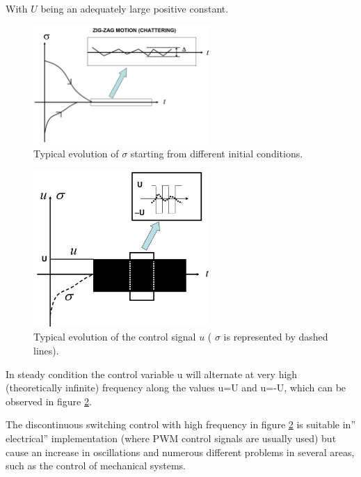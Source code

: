 \documentclass{thesisreport}
\begin{document}
With $U$ being an adequately large positive constant.

\begin{figure}[h]
\centering
\includegraphics[width=0.6\textwidth]{Images/Control/first_order_sliding_mode_control}
\caption{Typical evolution of $\sigma$ starting from different initial conditions.}
\label{sigma_evolution}
\end{figure}

\begin{figure}[h]
\centering
\includegraphics[width=0.6\textwidth]{Images/Control/first_order_sliding_mode_control_b}
\caption{Typical evolution of the control signal $u$ ( $\sigma$ is represented by dashed lines).}
\label{control_evolution}
\end{figure}


\noindent In steady condition the control variable u will alternate at very high (theoretically infinite) frequency along the values u=U
and u=-U, which can be observed in figure \ref{control_evolution}.



\noindent The discontinuous switching control with high frequency  in figure \ref{control_evolution} is suitable in” electrical” implementation (where PWM control signals are usually used) but cause an increase in oscillations and numerous different problems in several areas, such as the control of mechanical systems.
\end{document}
